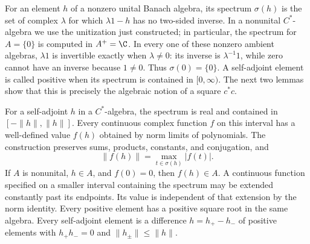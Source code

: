 For an element $h$ of a nonzero unital Banach algebra, its spectrum $\sigma(h)$
is the set of complex $\lambda$ for which $\lambda1-h$ has no two-sided
inverse.  In a nonunital $C^*$-algebra we use the unitization just constructed;
in particular, the spectrum for $A=\{0\}$ is computed in $A^+=\C$.
In every one of these nonzero ambient algebras, $\lambda1$ is invertible
exactly when $\lambda\ne0$: its inverse is $\lambda^{-1}1$, while zero
cannot have an inverse because $1\ne0$.  Thus $\sigma(0)=\{0\}$.
A self-adjoint element is called positive when its spectrum is contained in
$[0,\infty)$.  The next two lemmas show that this is precisely the algebraic
notion of a square $c^*c$.

\begin{lemma}
\label{lem:cstar-calculus}
For a self-adjoint $h$ in a $C^*$-algebra, the spectrum is real and contained
in $[-\|h\|,\|h\|]$.  Every continuous complex function $f$ on this interval
has a well-defined value $f(h)$ obtained by norm limits of polynomials.
The construction preserves sums, products, constants, and conjugation, and
\[
 \|f(h)\|=\max_{t\in\sigma(h)}|f(t)|.
\]
If $A$ is nonunital, $h\in A$, and $f(0)=0$, then $f(h)\in A$.
A continuous function specified on a smaller interval containing the spectrum
may be extended constantly past its endpoints.  Its value is independent
of that extension by the norm identity.
Every positive element has a positive square root in the same algebra.
Every self-adjoint element is a difference $h=h_+-h_-$ of positive elements
with $h_+h_-=0$ and $\|h_\pm\|\leq\|h\|$.
\end{lemma}

